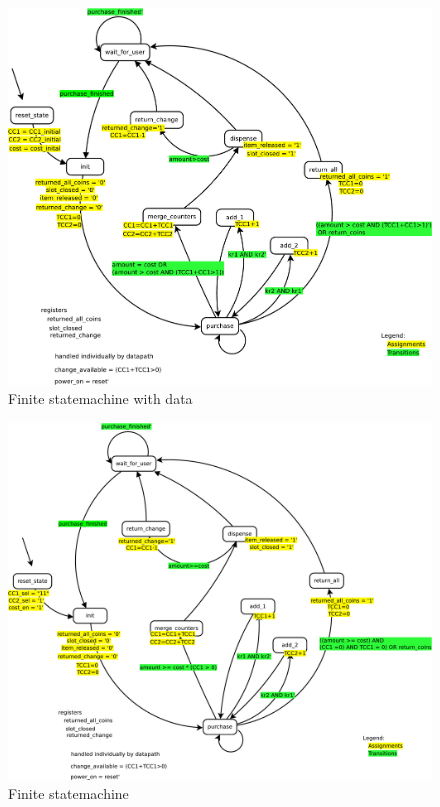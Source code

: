 \label{app:figures}


\begin{figure}
\centering
\includegraphics[width=1.0\textwidth]{fig/FSMD.pdf}
\caption{Finite statemachine with data}
\label{fig:fsmd}
\end{figure}

\begin{figure}
\centering
\includegraphics[width=1.0\textwidth]{fig/FSM.pdf}
\caption{Finite statemachine}
\label{fig:fsm}
\end{figure}

